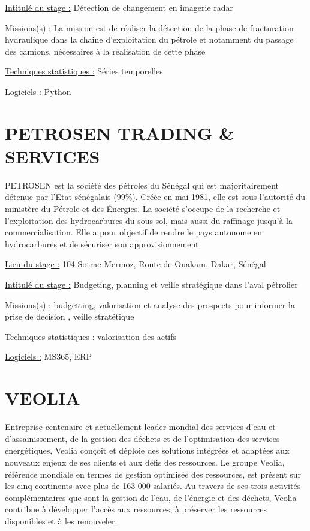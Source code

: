 \documentclass[
  letterpaper,
  DIV=11,
  numbers=noendperiod]{scrreprt}
\begin{document}
\uline{Intitulé du stage :} Détection de changement en imagerie radar

\uline{Missions(s) :} La mission est de réaliser la détection de la
phase de fracturation hydraulique dans la chaine d'exploitation du
pétrole et notamment du passage des camions, nécessaires à la
réalisation de cette phase

\uline{Techniques statistiques :} Séries temporelles

\uline{Logiciels :} Python

\hypertarget{petrosen-trading-services}{%
\section{\texorpdfstring{\textbf{PETROSEN TRADING \&
SERVICES}}{PETROSEN TRADING \& SERVICES}}\label{petrosen-trading-services}}

PETROSEN est la société des pétroles du Sénégal qui est majoritairement
détenue par l'Etat sénégalais (99\%). Créée en mai 1981, elle est sous
l'autorité du ministère du Pétrole et des Énergies. La société s'occupe
de la recherche et l'exploitation des hydrocarbures du sous-sol, mais
aussi du raffinage jusqu'à la commercialisation. Elle a pour objectif de
rendre le pays autonome en hydrocarbures et de sécuriser son
approvisionnement.

\uline{Lieu du stage :} 104 Sotrac Mermoz, Route de Ouakam, Dakar,
Sénégal

\uline{Intitulé du stage :} Budgeting, planning et veille stratégique
dans l'aval pétrolier

\uline{Missions(s) :} budgetting, valorisation et analyse des prospects
pour informer la prise de decision , veille stratétique

\uline{Techniques statistiques :} valorisation des actifs

\uline{Logiciels :} MS365, ERP

\hypertarget{veolia}{%
\section{\texorpdfstring{\textbf{VEOLIA}}{VEOLIA}}\label{veolia}}

Entreprise centenaire et actuellement leader mondial des services d'eau
et d'assainissement, de la gestion des déchets et de l'optimisation des
services énergétiques, Veolia conçoit et déploie des solutions intégrées
et adaptées aux nouveaux enjeux de ses clients et aux défis des
ressources. Le groupe Veolia, référence mondiale en termes de gestion
optimisée des ressources, est présent sur les cinq continents avec plus
de 163 000 salariés. Au travers de ses trois activités complémentaires
que sont la gestion de l'eau, de l'énergie et des déchets, Veolia
contribue à développer l'accès aux ressources, à préserver les
ressources disponibles et à les renouveler.
\end{document}
